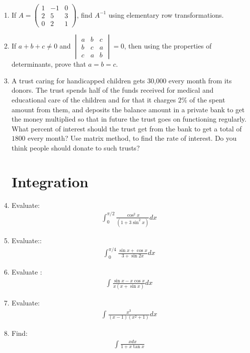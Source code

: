 \documentclass[12pt,-letter paper]{article}
\newcommand{\myvec}[1]{\ensuremath{\begin{pmatrix}#1\end{pmatrix}}}
\newcommand{\mydet}[1]{\ensuremath{\begin{vmatrix}#1\end{vmatrix}}}
\begin{document}
\begin{enumerate}
	\item If $A = \myvec{1&-1&0\\2&5&3\\0&2&1}$, find $A^{-1}$ using elementary row transformations.

	\item If $a+b+c\neq0$ and $\mydet{a&b&c\\b&c&a\\c&a&b}=0$, then using the properties of determinants, prove that $a=b=c$.

	\item A trust caring for handicapped children gets 30,000 every month from its donors. The trust spends half of the funds received for medical and educational care of the children and for that it charges $2\%$ of the spent amount from them, and deposits the balance amount in a private bank to get the money multiplied so that in future the trust goes on functioning regularly. What percent of interest should the trust get from the bank to get a total of \rupee $1800$ every month? Use matrix method, to find the rate of interest. Do you think people should donate to such trusts?


\section{Integration}
	\item Evaluate: 
    \begin{align*}
         \int_0^{\pi/2} \frac{\cos^2{x}}{(1 + 3\sin^2 x)} dx
    \end{align*}
 

	\item Evaluate:: 
    \begin{align*}
        \int_0^{\pi/4} \frac{\sin{x}+\cos{x}}{3+\sin{2x}} dx
    \end{align*}

	\item Evaluate :
    \begin{align*}
        \int \frac{\sin{x}-x\cos{x}}{x(x+\sin{x})} dx
    \end{align*}

	\item Evaluate:
    \begin{align*}
        \int \frac{x^3}{(x-1)(x^2+1)} dx
    \end{align*}

	\item Find:
    \begin{align*}
         \int \frac{xdx}{1+x\tan{x}}
    \end{align*}


\end{enumerate}
\end{document}
